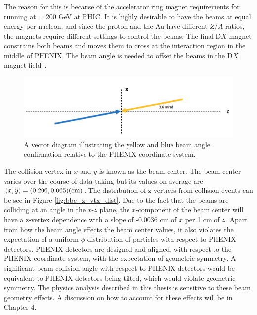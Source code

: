 The reason for this is because of the accelerator ring magnet requirements for running \pau at \sqsn = 200 GeV at RHIC. It is highly desirable to have the beams at equal energy per nucleon, and since the proton and the Au have different $Z$/$A$ ratios, the magnets require different settings to control the beams. The final D$X$ magnet constrains both beams and moves them to cross at the interaction region in the middle of PHENIX. The beam angle is needed to offset the beams in the D$X$ magnet field~\cite{BNL_Run15_Operations}.

\begin{figure}[!ht]
\centering
\includegraphics[width=0.85\linewidth]{figs/beam_angle.png}
\caption{A vector diagram illustrating the yellow and blue beam angle confirmation relative to the PHENIX coordinate system.}
\label{fig:beam_angle}
\end{figure}

The collision vertex in $x$ and $y$ is known as the beam center. The beam center varies over the course of data taking but its values on average are $(x,y) = (0.206,0.065) (\rm cm)$. The distribution of z-vertices from collision events can be see in Figure \ref{fig:bbc_z_vtx_dist}. Due to the fact that the beams are colliding at an angle in the $x$-$z$ plane, the $x$-component of the beam center will have a z-vertex dependence with a slope of -0.0036 cm of $x$ per 1 cm of $z$.
Apart from how the beam angle effects the beam center values, it also violates the expectation of a uniform $\phi$ distribution of particles with respect to PHENIX detectors. PHENIX detectors are designed and aligned, with respect to the PHENIX coordinate system, with the expectation of geometric symmetry. A significant beam collision angle with respect to PHENIX detectors would be equivalent to PHENIX detectors being tilted, which would violate geometric symmetry.
The physics analysis described in this thesis is sensitive to these beam geometry effects. A discussion on how to account for these effects will be in Chapter 4.


